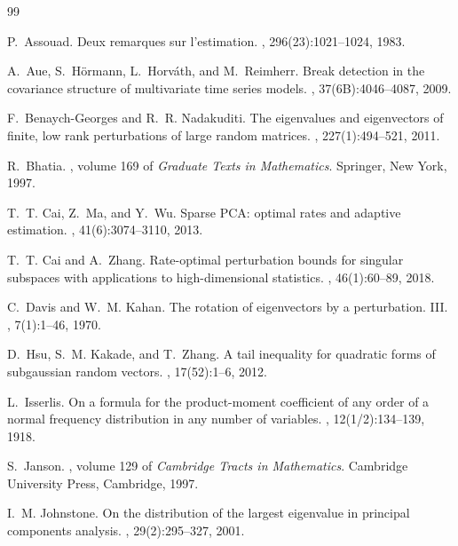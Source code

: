 \documentclass[11pt]{article}
\theoremstyle{tightplain}
\theoremstyle{tightdef}
\begin{document}
\begin{thebibliography}{99}

P.~Assouad.
\newblock Deux remarques sur l'estimation.
, 296(23):1021--1024, 1983.

A.~Aue, S.~H\"ormann, L.~Horv\'ath, and M.~Reimherr.
\newblock Break detection in the covariance structure of multivariate time
  series models.
, 37(6B):4046--4087, 2009.

F.~Benaych-Georges and R.~R. Nadakuditi.
\newblock The eigenvalues and eigenvectors of finite, low rank perturbations of
  large random matrices.
, 227(1):494--521, 2011.

R.~Bhatia.
, volume 169 of {\em Graduate Texts in
  Mathematics}.
\newblock Springer, New York, 1997.

T.~T. Cai, Z.~Ma, and Y.~Wu.
\newblock Sparse {PCA}: optimal rates and adaptive estimation.
, 41(6):3074--3110, 2013.

T.~T. Cai and A.~Zhang.
\newblock Rate-optimal perturbation bounds for singular subspaces with
  applications to high-dimensional statistics.
, 46(1):60--89, 2018.

C.~Davis and W.~M. Kahan.
\newblock The rotation of eigenvectors by a perturbation. {III}.
, 7(1):1--46, 1970.

D.~Hsu, S.~M. Kakade, and T.~Zhang.
\newblock A tail inequality for quadratic forms of subgaussian random vectors.
, 17(52):1--6, 2012.

L.~Isserlis.
\newblock On a formula for the product-moment coefficient of any order of a
  normal frequency distribution in any number of variables.
, 12(1/2):134--139, 1918.

S.~Janson.
, volume 129 of {\em Cambridge Tracts in
  Mathematics}.
\newblock Cambridge University Press, Cambridge, 1997.

I.~M. Johnstone.
\newblock On the distribution of the largest eigenvalue in principal components
  analysis.
, 29(2):295--327, 2001.


\end{thebibliography}
\end{document}
